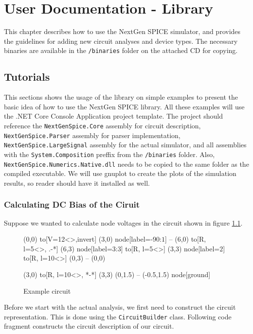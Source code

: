 \chapter{User Documentation - Library}

This chapter describes how to use the NextGen SPICE simulator, and provides the guidelines for adding new circuit analyses and device types. The necessary binaries are available in the \texttt{/binaries} folder on the attached CD for copying. 

\section{Tutorials}
This sections shows the usage of the library on simple examples to present the basic idea of how to use the NextGen SPICE library. All these examples will use the .NET Core Console Application project template. The project should reference the \texttt{NextGenSpice.Core} assembly for circuit description, \texttt{NextGenSpice.Parser} assembly for parser implementation, \texttt{NextGenSpice.LargeSignal} assembly for the actual simulator, and all assemblies with the \texttt{System.Composition} preffix from the \texttt{/binaries} folder. Also, \texttt{NextGenSpice.Numerics.Native.dll} needs to be copied to the same folder as the compiled executable. We will use gnuplot \cite{gnuplot} to create the plots of the simulation results, so reader should have it installed as well.

\subsection{Calculating DC Bias of the Ciruit}
Suppose we wanted to calculate node voltages in the circuit shown in figure \ref{fig:userdocs:simple-circuit}.

\begin{figure}[h]
	\centering
	\begin{circuitdev}
		(0,0) 
		to[V=12<\volt>,invert] (3,0) node[label={-90:$1$}]{}
		-- (6,0)
		to[R, l=5<\ohm>, .-*] (6,3) node[label={3:$3$}]{}
		to[R, l=5<\ohm>] (3,3) node[label={$2$}]{}
		to[R, l=10<\ohm>] (0,3)
		-- (0,0)
	
		(3,0) to[R, l=10<\ohm>, *-*] (3,3)
		(0,1.5) -- (-0.5,1.5) node[ground]{}
	\end{circuitdev}
	\caption{Example circuit}
	\label{fig:userdocs:simple-circuit}
\end{figure}

Before we start with the actual analysis, we first need to construct the circuit representation. This is done using the \texttt{CircuitBuilder} class. Following code fragment constructs the circuit description of our circuit.

